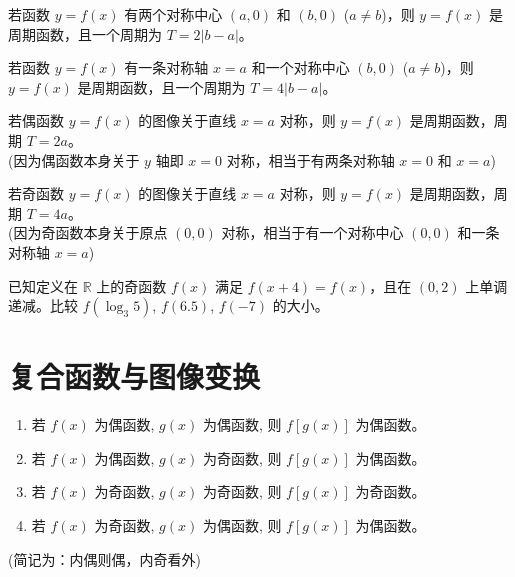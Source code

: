 \begin{theorem}[两个对称中心]
    若函数 $y=f(x)$ 有两个对称中心 $(a,0)$ 和 $(b,0)$ ($a \neq b$)，则 $y=f(x)$ 是周期函数，且一个周期为 $T=2|b-a|$。
\end{theorem}

\begin{theorem}[一个对称轴与一个对称中心]
    若函数 $y=f(x)$ 有一条对称轴 $x=a$ 和一个对称中心 $(b,0)$ ($a \neq b$)，则 $y=f(x)$ 是周期函数，且一个周期为 $T=4|b-a|$。
\end{theorem}

\begin{theorem}[偶函数的对称性推论]
    若偶函数 $y=f(x)$ 的图像关于直线 $x=a$ 对称，则 $y=f(x)$ 是周期函数，周期 $T=2a$。\\
    (因为偶函数本身关于 $y$ 轴即 $x=0$ 对称，相当于有两条对称轴 $x=0$ 和 $x=a$)
\end{theorem}

\begin{theorem}[奇函数的对称性推论]
    若奇函数 $y=f(x)$ 的图像关于直线 $x=a$ 对称，则 $y=f(x)$ 是周期函数，周期 $T=4a$。\\
    (因为奇函数本身关于原点 $(0,0)$ 对称，相当于有一个对称中心 $(0,0)$ 和一条对称轴 $x=a$)
\end{theorem}

\begin{problem}
已知定义在 $\mathbb{R}$ 上的奇函数 $f(x)$ 满足 $f(x+4)=f(x)$，且在 $(0,2)$ 上单调递减。比较 $f(\log_3 5)$, $f(6.5)$, $f(-7)$ 的大小。
\end{problem}

\section{复合函数与图像变换}

\begin{theorem}[复合函数的奇偶性]
    \begin{enumerate}
        \item 若 $f(x)$ 为偶函数, $g(x)$ 为偶函数, 则 $f[g(x)]$ 为偶函数。
        \item 若 $f(x)$ 为偶函数, $g(x)$ 为奇函数, 则 $f[g(x)]$ 为偶函数。
        \item 若 $f(x)$ 为奇函数, $g(x)$ 为奇函数, 则 $f[g(x)]$ 为奇函数。
        \item 若 $f(x)$ 为奇函数, $g(x)$ 为偶函数, 则 $f[g(x)]$ 为偶函数。
    \end{enumerate}
    (简记为：内偶则偶，内奇看外)
\end{theorem}

